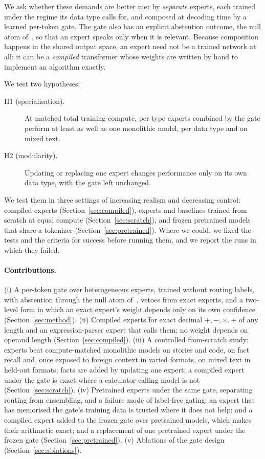 \documentclass[10pt]{article}
\begin{document}
We ask whether these demands are better met by \emph{separate} experts, each trained under the
regime its data type calls for, and composed at decoding time by a learned per-token gate. The
gate also has an explicit abstention outcome, the null atom of~\citet{mossaiby_roas}, so that an
expert speaks only when it is relevant. Because composition happens in the shared output space,
an expert need not be a trained network at all: it can be a \emph{compiled} transformer whose
weights are written by hand to implement an algorithm exactly.

We test two hypotheses:
\begin{description}
\item[H1 (specialisation).] At matched total training compute, per-type experts combined by the
gate perform at least as well as one monolithic model, per data type and on mixed text.
\item[H2 (modularity).] Updating or replacing one expert changes performance only on its own
data type, with the gate left unchanged.
\end{description}
We test them in three settings of increasing realism and decreasing control: compiled experts
(Section~\ref{sec:compiled}), experts and baselines trained from scratch at equal compute
(Section~\ref{sec:scratch}), and frozen pretrained models that share a tokenizer
(Section~\ref{sec:pretrained}). Where we could, we fixed the tests and the criteria for success
before running them, and we report the runs in which they failed.

\paragraph{Contributions.}
(i) A per-token gate over heterogeneous experts, trained without routing labels, with
abstention through the null atom of~\citet{mossaiby_roas}, vetoes from exact experts, and a
two-level form in which an exact expert's weight depends only on its own confidence
(Section~\ref{sec:method}).
(ii) Compiled experts for exact decimal $+,-,\times,\div$ of any length and an expression-parser
expert that calls them; no weight depends on operand length (Section~\ref{sec:compiled}).
(iii) A controlled from-scratch study: experts beat compute-matched monolithic models on stories
and code, on fact recall and, once exposed to foreign context in varied formats, on mixed
text in held-out formats; facts are added by updating one expert; a compiled expert under the
gate is exact where a calculator-calling model is not (Section~\ref{sec:scratch}).
(iv) Pretrained experts under the same gate, separating routing from ensembling, and a failure
mode of label-free gating: an expert that has memorised the gate's training data is trusted
where it does not help; and a compiled expert added to the frozen gate over pretrained
models, which makes their arithmetic exact; and a replacement of one pretrained expert under the
frozen gate (Section~\ref{sec:pretrained}).
(v) Ablations of the gate design (Section~\ref{sec:ablations}).
\end{document}
